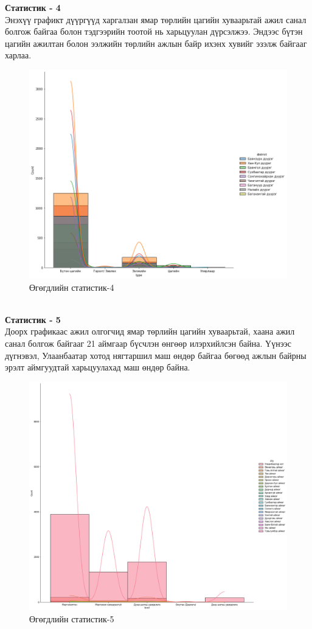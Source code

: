 \newpage
\textbf{Статистик - 4}
\\Энэхүү графикт дүүргүүд харгалзан ямар төрлийн цагийн хуваарьтай ажил санал болгож байгаа болон тэдгээрийн тоотой нь харьцуулан дүрсэлжээ. Эндээс бүтэн цагийн ажилтан болон ээлжийн төрлийн ажлын байр ихэнх хувийг эзэлж байгааг харлаа.
\begin{figure}[ht]
  \centering
  \includegraphics[width=15cm]{graphics/5.png}
  \caption{Өгөгдлийн статистик-4}
  \label{fig:statistics5}
\end{figure}
\\\textbf{Статистик - 5}
\\Доорх графикаас ажил олгогчид ямар төрлийн цагийн хуваарьтай, хаана ажил санал болгож байгааг 21 аймгаар бүсчлэн өнгөөр илэрхийлсэн байна. Үүнээс дүгнэвэл, Улаанбаатар хотод нягтаршил маш өндөр байгаа бөгөөд ажлын байрны эрэлт аймгуудтай харьцуулахад маш өндөр байна.
\begin{figure}[ht]
  \centering
  \includegraphics[width=15cm]{graphics/6.png}
  \caption{Өгөгдлийн статистик-5}
  \label{fig:statistics6}
\end{figure}
